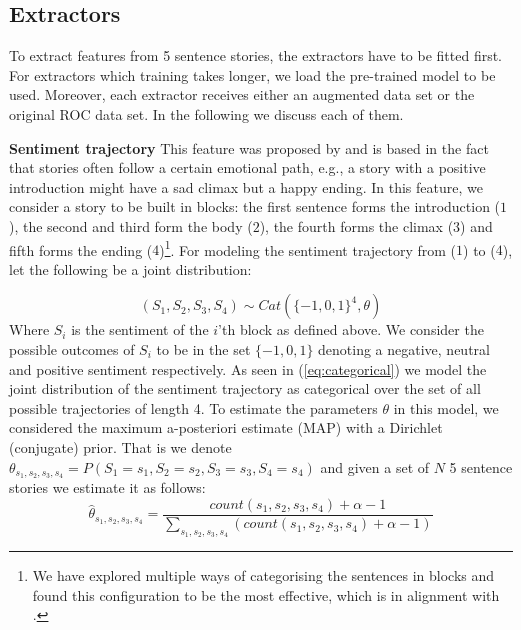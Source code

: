 \documentclass{article}
\begin{document}
\subsection{Extractors}

To extract features from 5 sentence stories, the extractors have to be fitted
first. For extractors which training takes longer, we load the pre-trained model
to be used. Moreover, each extractor receives either an augmented data set or
the original ROC data set. In the following we discuss each of them.



\textbf{Sentiment trajectory} This feature was proposed by
\cite{COGCOMP} and is based in the fact that stories often follow a certain
emotional path, e.g., a story with a positive introduction might have a sad
climax but a happy ending. In this feature, we consider a story to be built in
blocks: the first sentence forms the introduction ($1$), the second
and third form the body ($2$), the fourth forms the climax ($3$) and fifth forms
the ending ($4$)\footnote{We have explored multiple ways of categorising the
    sentences in blocks and found this configuration to be the most effective,
    which is in alignment with \cite{COGCOMP}.}. For modeling the sentiment 
trajectory from ($1$) to ($4$), let the following be a joint distribution:

\begin{equation}
\label{eq:categorical}
(S_1, S_2,S_3,S_4) \sim Cat(\{-1,0,1\}^4, \theta)
\end{equation}
Where $S_i$ is the sentiment of the $i$'th block as defined above. We consider the possible outcomes of $S_i$ to be in the set $\{-1,0,1\}$ denoting a negative, neutral and positive sentiment respectively.  As seen in (\ref{eq:categorical}) we model the joint distribution of the sentiment trajectory as categorical over the set of all possible trajectories of length 4. To estimate the parameters $\theta$ in this model, we considered the maximum a-posteriori estimate (MAP) with a Dirichlet (conjugate) prior. That is we denote $\theta_{s_1,s_2,s_3,s_4} = P(S_1 = s_1, S_2=s_2, S_3=s_3, S_4=s_4)$ and given a set of $N$ 5 sentence stories we estimate it as follows:
\begin{equation}
\label{eq:estimate_sentiment}
\hat{\theta}_{s_1,s_2,s_3,s_4} = \frac{count(s_1,s_2,s_3,s_4) + \alpha - 1}{\sum\limits_{s_1,s_2,s_3,s_4}(count(s_1,s_2,s_3,s_4) + \alpha-1) }
\end{equation}
\end{document}
